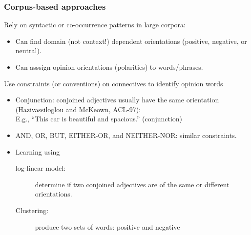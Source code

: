 \documentclass[t]{beamer}
\begin{document}
\begin{frame} \frametitle{Corpus-based approaches} %


Rely on syntactic or co-occurrence patterns in large corpora:
\begin{itemize}
\item Can find domain (not context!) dependent orientations (positive,
  negative, or neutral). 
\item Can asssign opinion orientations (polarities) to words/phrases.
\end{itemize}

\vfill
Use constraints (or conventions) on connectives to identify  opinion words
\begin{itemize}
\item Conjunction: conjoined adjectives usually have the same
  orientation (Hazivassiloglou and McKeown, ACL-97):\\
E.g., ``This car is beautiful and spacious.'' (conjunction)
\item AND, OR, BUT, EITHER-OR, and NEITHER-NOR: similar constraints.
\item Learning using 
\begin{description}
    \item [log-linear model:] determine if two conjoined adjectives are of the same or different orientations. 
    \item [Clustering:] produce two sets of words: positive and negative
\end{description}
\end{itemize}
\end{frame}


\end{document}

